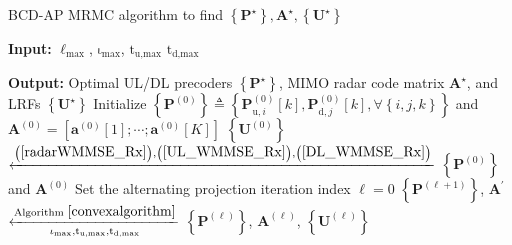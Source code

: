 \documentclass[10pt,journal]{IEEEtran}
\newcommand{\paren}[1]{\left({#1}\right)}
\newcommand{\bracket}[1]{{\left [{#1}\right ]}}
\newcommand{\braces}[1]{{\left\{ {#1}\right\}}}
\newcommand{\rr}{_\mathrm{r}}
\newcommand{\B}{\textrm{B}}
\newcommand{\rnr}{_{\mathrm{r},n_\mathrm{r}}}
\newcommand{\HrB}{\mathbf{H}_{\textrm{rB}}}
\newcommand{\Hrj}{\mathbf{H}_{\textrm{r},j}}
\newcommand{\HBj}{\mathbf{H}_{\textrm{B},j}}
\newcommand{\HiB}{\mathbf{H}_{i,\textrm{B}}}
\theoremstyle{definition}
\begin{document}
	\begin{algorithm}[ht!]
	    \caption{BCD-AP MRMC algorithm to find $\braces{\mathbf{P}^\star},\mathbf{A}^\star,\braces{\mathbf{U}^\star}$}
		\label{Alternating_sum}
		\begin{algorithmic}[1]
			\Statex \textbf{Input:} $\mathrm{\ell}_{\textrm{max}}$, $\mathrm{\iota}_{\textrm{max}}$, $\mathrm{t}_{\textrm{u,max}}$ $\mathrm{t}_{\textrm{d,max}}$
			
			\Statex \textbf{Output:} Optimal UL/DL precoders $\braces{\mathbf{P}^\star}$, MIMO radar code matrix $\mathbf{A}^\star$, and LRFs $\braces{\mathbf{U}^\star}$
			\State Initialize $\braces{\mathbf{P}^{\paren{\mathrm{0}}}}\triangleq
			\braces{\mathbf{P}^{\paren{\mathrm{0}}}_{\textrm{u},i}\bracket{k},\mathbf{P}^{\paren{\mathrm{0}}}_{\textrm{d},j}\bracket{k}, \forall \braces{i,j,k}}$ and $\mathbf{A}^{\paren{\mathrm{0}}}=\bracket{\mathbf{a}^{\paren{\mathrm{0}}}\bracket{1};\cdots;\mathbf{a}^{\paren{\mathrm{0}}}\bracket{\mathrm{\mathit{K}}}}$
			\State %
			$\braces{\mathbf{U}^{\paren{\mathrm{0}}}}$ $\xleftarrow{\mathrm{\paren{\ref{radarWMMSE_Rx}}},\mathrm{\paren{\ref{UL_WMMSE_Rx}}},\mathrm{\paren{\ref{DL_WMMSE_Rx}}}}$  $\braces{\mathbf{P}^{\paren{\mathrm{0}}}}$ and $\mathbf{A}^{\paren{\mathrm{0}}}$ 
			\State Set the alternating projection iteration index $\mathrm{\ell=0}$
			\Repeat \; 
			\State $\braces{\mathbf{P}^{\paren{\mathrm{\ell+1}}}}$, $\mathbf{A}^\prime$ $\xleftarrow[\mathrm{\iota}_{\textrm{max}},\mathrm{t}_{\textrm{u,max}},\mathrm{t}_{\textrm{d,max}}]{\textrm{Algorithm }\ref{convexalgorithm}}$ $\braces{\mathbf{P}^{\paren{\mathrm{\ell}}}}$, $\mathbf{A}^{\paren{\mathrm{\ell}}}$, $\braces{\mathbf{U}^{\paren{\mathrm{\ell}}}}$  %

\end{algorithmic}
\end{algorithm}
\end{document}
